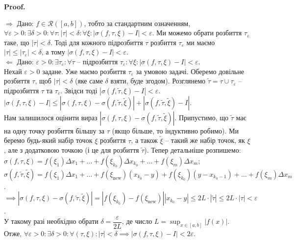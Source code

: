 \documentclass[a4paper, 10pt]{article}
\makeatletter
\def\rightproof{$\boxed{\Rightarrow}$ }
\def\leftproof{$\boxed{\Leftarrow}$ }
\theoremstyle{theoremdd}
\theoremstyle{theoremdd}
\theoremstyle{theoremdd}
\theoremstyle{theoremdd}
\theoremstyle{theoremdd}
\theoremstyle{theoremdd}
\theoremstyle{theoremdd}
\theoremstyle{theoremdd}
\theoremstyle{theoremdd}
\renewenvironment{proof}[1][Proof.\\]{\par
\pushQED{\hfill \qed}%
\normalfont \topsep6\p@\@plus6\p@\relax
\trivlist
\item\relax
{\bfseries
#1\@addpunct{.}}\hspace\labelsep\ignorespaces
}{%
\popQED\endtrivlist\@endpefalse
}
\makeatother
\begin{document}
\begin{proof}
\rightproof Дано: $f \in \mathcal{R}([a,b])$, тобто за стандартним означенням, $\forall \varepsilon > 0: \exists \delta > 0: \forall \tau: |\tau| < \delta: \forall \xi: |\sigma(f,\tau,\xi) - I| < \varepsilon$. Ми можемо обрати розбиття $\tau_\varepsilon$ таке, що $|\tau| < \delta$. Тоді для кожного підрозбиття $\tau$ розбиття $\tau_\varepsilon$ ми маємо $|\tau| \leq |\tau_\varepsilon| < \delta$, а тому $|\sigma(f,\tau,\xi) - I| < \varepsilon$.
\bigskip \\
\leftproof Дано: $\varepsilon > 0: \exists \tau_\varepsilon: \forall \tau$ -- підрозбиття $\tau_\varepsilon: \forall \xi: |\sigma(f,\tau,\xi) - I| < \varepsilon$.\\
Нехай $\varepsilon > 0$ задане. Уже маємо розбиття $\tau_\varepsilon$ за умовою задачі. Оберемо довільне розбиття $\tau$, щоб $|\tau| < \delta$ (яке саме $\delta$ взяти, буде згодом). Розглянемо $\tilde{\tau} = \tau \cup \tau_\varepsilon$ -- підрозбиття $\tau$ та $\tau_\varepsilon$. Звідси тоді $|\sigma(f,\tilde{\tau},\xi) - I| < \varepsilon$.\\
$|\sigma(f,\tau,\xi) - I| \leq |\sigma(f,\tau,\xi) - \sigma(f,\tilde{\tau}, \tilde{\xi})| + |\sigma(f,\tilde{\tau}, \tilde{\xi}) - I|$.\\
Нам залишилося оцінити вираз $|\sigma(f,\tau,\xi) - \sigma(f,\tilde{\tau}, \tilde{\xi})|$. Припустимо, що $\tilde{\tau}$ має на одну точку розбиття більшу за $\tau$ (якщо більше, то індуктивно робимо). Ми беремо будь-який набір точок $\xi$ розбиття $\tau$, а також $\tilde{\xi}$ -- такий же набір точок, як $\xi$, але з додатковою точкою (і це для розбиття $\tilde{\tau}$). Тепер детальніше розпишемо:\\
$\sigma(f,\tau,\xi) = f(\xi_1) \Delta x_1 + \dots + f(\xi_{k_0}) \Delta x_{k_0} + \dots + f(\xi_m) \Delta x_m$;\\
$\sigma(f,\tilde{\tau},\tilde{\xi}) = f(\xi_1) \Delta x_1 + \dots + f(\xi_{\text{new}})(x_{k_0}-y) + f(\xi_{k_0})(y - x_{k_0-1}) + \dots + f(\xi_m) \Delta x_m$.\\
$\implies |\sigma(f,\tau,\xi) - \sigma(f,\tilde{\tau},\tilde{\xi})| = |f(\xi_{k_0}) - f(\xi_{\text{new}})| |x_{k_0}-y| \leq 2L \cdot |\tilde{\tau}| \leq 2L \cdot |\tau| < \varepsilon$.\\
У такому разі необхідно обрати $\delta = \dfrac{\varepsilon}{2L}$, де число $L = \displaystyle\sup_{x \in [a,b]} |f(x)|$.\\
Отже, $\forall \varepsilon > 0: \exists \delta > 0: \forall (\tau,\xi): |\tau| < \delta \implies |\sigma(f,\tau,\xi) - I| < 2\varepsilon$.
\end{proof}
\end{document}
